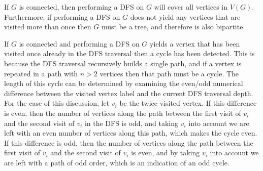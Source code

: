 \documentclass[a4paper,10pt]{article}
\begin{document}
If $G$ is connected, then performing a DFS on $G$ will cover all vertices in $V(G)$. Furthermore, if performing a DFS on $G$ does not yield any vertices that are visited more than once then $G$ must be a tree, and therefore is also bipartite. 

If $G$ is connected and performing a DFS on $G$ yields a vertex that has been visited once already in the DFS traversal then a cycle has been detected. This is because the DFS traversal recursively builds a single path, and if a vertex is repeated in a path with $n > 2$ vertices then that path must be a cycle. The length of this cycle can be determined by examining the even/odd numerical difference between the visited vertex label and the current DFS traversal depth. For the case of this discussion, let $v_{i}$ be the twice-visited vertex. If this difference is even, then the number of vertices along the path between the first visit of $v_{i}$ and the second visit of $v_{i}$ in the DFS is odd, and taking $v_{i}$ into account we are left with an even number of vertices along this path, which makes the cycle even. If this difference is odd, then the number of vertices along the path between the first visit of $v_{i}$ and the second visit of $v_{i}$ is even, and by taking $v_{i}$ into account we are left with a path of odd order, which is an indication of an odd cycle. 

\end{document}
